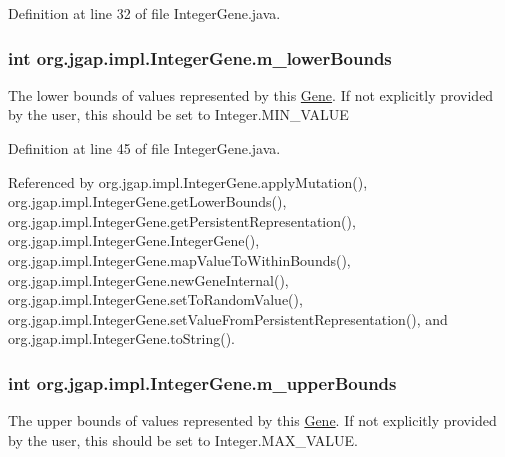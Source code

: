 Definition at line 32 of file Integer\-Gene.\-java.

\hypertarget{classorg_1_1jgap_1_1impl_1_1_integer_gene_a71ba6d9ef1c55621d69f0a7fcc00360b}{
\subsubsection[{m\-\_\-lower\-Bounds}]{\setlength{\rightskip}{0pt plus 5cm}int org.\-jgap.\-impl.\-Integer\-Gene.\-m\-\_\-lower\-Bounds\hspace{0.3cm}{\ttfamily [private]}}}\label{classorg_1_1jgap_1_1impl_1_1_integer_gene_a71ba6d9ef1c55621d69f0a7fcc00360b}
The lower bounds of values represented by this \hyperlink{interfaceorg_1_1jgap_1_1_gene}{Gene}. If not explicitly provided by the user, this should be set to Integer.\-M\-I\-N\-\_\-\-V\-A\-L\-U\-E 

Definition at line 45 of file Integer\-Gene.\-java.



Referenced by org.\-jgap.\-impl.\-Integer\-Gene.\-apply\-Mutation(), org.\-jgap.\-impl.\-Integer\-Gene.\-get\-Lower\-Bounds(), org.\-jgap.\-impl.\-Integer\-Gene.\-get\-Persistent\-Representation(), org.\-jgap.\-impl.\-Integer\-Gene.\-Integer\-Gene(), org.\-jgap.\-impl.\-Integer\-Gene.\-map\-Value\-To\-Within\-Bounds(), org.\-jgap.\-impl.\-Integer\-Gene.\-new\-Gene\-Internal(), org.\-jgap.\-impl.\-Integer\-Gene.\-set\-To\-Random\-Value(), org.\-jgap.\-impl.\-Integer\-Gene.\-set\-Value\-From\-Persistent\-Representation(), and org.\-jgap.\-impl.\-Integer\-Gene.\-to\-String().

\hypertarget{classorg_1_1jgap_1_1impl_1_1_integer_gene_a80d01e26893dfaef21fa9223d2e375f4}{
\subsubsection[{m\-\_\-upper\-Bounds}]{\setlength{\rightskip}{0pt plus 5cm}int org.\-jgap.\-impl.\-Integer\-Gene.\-m\-\_\-upper\-Bounds\hspace{0.3cm}{\ttfamily [private]}}}\label{classorg_1_1jgap_1_1impl_1_1_integer_gene_a80d01e26893dfaef21fa9223d2e375f4}
The upper bounds of values represented by this \hyperlink{interfaceorg_1_1jgap_1_1_gene}{Gene}. If not explicitly provided by the user, this should be set to Integer.\-M\-A\-X\-\_\-\-V\-A\-L\-U\-E. 

